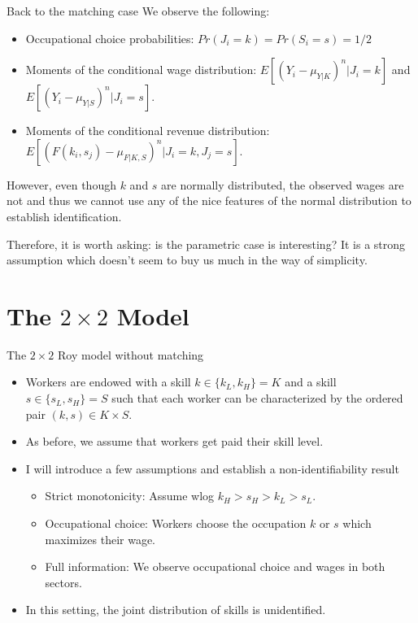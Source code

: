 \documentclass[aspectratio=169]{beamer}
\begin{document}
\begin{frame}{Back to the matching case}
	We observe the following:
	\smallskip
\begin{itemize}
	\item Occupational choice probabilities: $Pr(J_i = k)=Pr(S_i = s)=1/2$
	\item Moments of the conditional wage distribution: $E[(Y_i - \mu_{Y|K})^n| J_i = k]$ and $E[(Y_i - \mu_{Y|S})^n| J_i = s]$.
	\item Moments of the conditional revenue distribution: $E[(F(k_i,s_j)-\mu_{F|K,S})^n|J_i = k,J_j = s]$.
\end{itemize}

\vspace{0.25cm}

However, even though $k$ and $s$ are normally distributed, the observed wages are not and thus we cannot use any of the nice features of the normal distribution to establish identification.

\vspace{0.5cm}

Therefore, it is worth asking: is the parametric case is interesting? It is a strong assumption which doesn't seem to buy us much in the way of simplicity.
\end{frame}


\section{The $2\times 2$ Model}

\begin{frame}{The $2\times 2$ Roy model without matching}
	\begin{itemize}
		\item Workers are endowed with a skill $k\in\{k_L,k_H\}=K$ and a skill $s\in\{s_L,s_H\}=S$ such that each worker can be characterized by the ordered pair $(k,s)\in K\times S$.
		\bigskip
		\item As before, we assume that workers get paid their skill level.
		\bigskip
		\item I will introduce a few assumptions and establish a non-identifiability result
		\begin{itemize}
			\item Strict monotonicity: Assume wlog $k_H > s_H > k_L > s_L$.
			\smallskip
			\item Occupational choice: Workers choose the occupation $k$ or $s$ which maximizes their wage.
			\smallskip
			\item Full information: We observe occupational choice and wages in both sectors.
		\end{itemize}
		\bigskip
		\item In this setting, the joint distribution of skills is unidentified.
	\end{itemize}
\end{frame}
\end{document}
